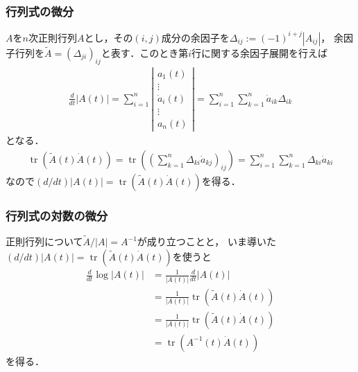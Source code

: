 \documentclass[10pt,usepdftitle=false,hyperref={unicode}]{beamer}
\DeclareMathOperator*{\tr}{tr}
\newcommand{\absolute}[1]{\left|#1\right|}
\newcommand{\parentheses}[1]{\left(#1\right)}
\begin{document}
\begin{frame}
\frametitle{行列式の微分}
$A$を$n$次正則行列$A$とし，その$\parentheses{i,j}$成分の余因子を$\varDelta_{ij} := \parentheses{-1}^{i + j}\absolute{A_{ij}}$，
余因子行列を$\widetilde{A} = \parentheses{\varDelta_{ji}}_{ij}$と表す．このとき第$i$行に関する余因子展開を行えば
\begin{align*}
    \frac{d}{dt}\absolute{A\parentheses{t}}
    = \sum_{i = 1}^n \absolute{%
        \begin{array}{c}
            a_1\parentheses{t} \\
            \vdots \\
            \dot{a}_i\parentheses{t} \\
            \vdots \\
            a_n\parentheses{t}
        \end{array}
    }
    = \sum_{i = 1}^n \sum_{k = 1}^n \dot{a}_{ik} \varDelta_{ik}
\end{align*}
となる．
\begin{align*}
    \tr \parentheses{\widetilde{A}\parentheses{t}\dot{A}\parentheses{t}}
    = \tr \parentheses{\parentheses{\sum_{k = 1}^n \varDelta_{ki} \dot{a}_{kj}}_{ij}}
    = \sum_{i = 1}^n \sum_{k = 1}^n \varDelta_{ki} \dot{a}_{ki}
\end{align*}
なので$\parentheses{d/dt}\absolute{A\parentheses{t}} = \tr \parentheses{\widetilde{A}\parentheses{t}\dot{A}\parentheses{t}}$を得る．\nocite{golberg1972derivative}
\end{frame}

\begin{frame}
\frametitle{行列式の対数の微分}
正則行列について$\widetilde{A} / \absolute{A} = A^{-1}$が成り立つことと，
いま導いた$\parentheses{d/dt}\absolute{A\parentheses{t}} = \tr\parentheses{\widetilde{A}\parentheses{t}\dot{A}\parentheses{t}}$を使うと
\begin{align*}
    \frac{d}{dt}\log\absolute{A\parentheses{t}}
    &= \frac{1}{\absolute{A\parentheses{t}}}\frac{d}{dt}\absolute{A\parentheses{t}} \\
    &= \frac{1}{\absolute{A\parentheses{t}}}\tr\parentheses{\widetilde{A}\parentheses{t}\dot{A}\parentheses{t}} \\
    &=  \frac{1}{\absolute{A\parentheses{t}}}\tr\parentheses{\widetilde{A}\parentheses{t}\dot{A}\parentheses{t}} \\
    &=  \tr\parentheses{A^{-1}\parentheses{t}\dot{A}\parentheses{t}}
\end{align*}
を得る．
\end{frame}
\end{document}
